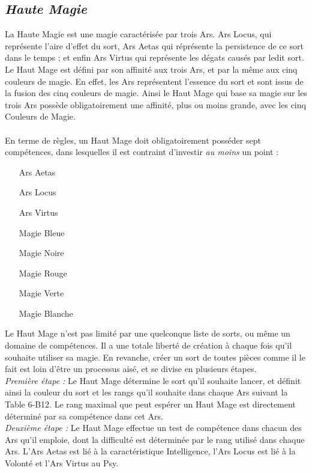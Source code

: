 \subsection{\em Haute Magie}
La Haute Magie est une magie caractérisée par trois Ars. Ars Locus, qui représente l'aire d'effet du sort, Ars Aetas qui réprésente la persistence de ce sort dans le temps ; et enfin Ars Virtus qui représente les dégats causés par ledit sort.\\
Le Haut Mage est défini par son affinité aux trois Ars, et par la même aux cinq couleurs de magie. En effet, les Ars représentent l'essence du sort et sont issus de la fusion des cinq couleurs de magie. Ainsi le Haut Mage qui base sa magie sur les trois Ars possède obligatoirement une affinité, plus ou moins grande, avec les cinq Couleurs de Magie.\\
\\
En terme de règles, un Haut Mage doit obligatoirement posséder sept compétences, dans lesquelles il est contraint d'investir {\em au moins} un point :
\begin{itemize}
\item[Ars Aetas]\Meta{ }
\item[Ars Locus]\Meta{ }
\item[Ars Virtus]\Meta{ }
\item[Magie Bleue]\Spe
\item[Magie Noire]\Spe
\item[Magie Rouge]\Spe
\item[Magie Verte]\Spe
\item[Magie Blanche]\Spe
\end{itemize}
Le Haut Mage n'est pas limité par une quelconque liste de sorts, ou même un domaine de compétences. Il a une totale liberté de création à chaque fois qu'il souhaite utiliser sa magie. En revanche, créer un sort de toutes pièces comme il le fait est loin d'être un processus aisé, et se divise en plusieurs étapes.\\
{\em Première étape :} Le Haut Mage détermine le sort qu'il souhaite lancer, et définit ainsi la couleur du sort et les rangs qu'il souhaite dans chaque Ars suivant la Table 6-B12. Le rang maximal que peut espérer un Haut Mage est directement déterminé par sa compétence dans cet Ars.\\
{\em Deuxième étape :} Le Haut Mage effectue un test de compétence dans chacun des Ars qu'il emploie, dont la difficulté est déterminée par le rang utilisé dans chaque Ars. L'Ars Aetas est lié à la caractéristique Intelligence, l'Ars Locus est lié à la Volonté et l'Ars Virtus au Psy.\\
